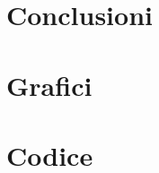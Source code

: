\documentclass[12pt]{article} %
\begin{document}
\section{Conclusioni}
	
\section {Grafici}
	\subsection {}

	
\section{Codice}	

\paragraph{}
	
\end{document}
